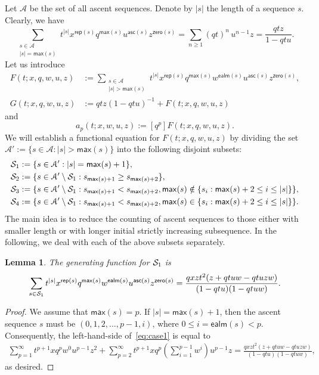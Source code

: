 \documentclass[12pt]{amsart}
\newcounter{mycount}
\theoremstyle{plain}
\newtheorem{lemma}[mycount]{Lemma}
\theoremstyle{definition}
\theoremstyle{example}
\theoremstyle{remark}
\numberwithin{equation}{section}
\numberwithin{figure}{section}
\newcommand{\asc}{\mathsf{asc}}
\def\max{\mathsf{max}}
\def\zero{\mathsf{zero}}
\def\rep{\mathsf{rep}}
\def\ealm{\mathsf{ealm}}
\def\A{\mathcal{A}}
\def\CS{ \CMcal{S}}
\begin{document}
Let $\A$ be the set of all ascent sequences. Denote by $|s|$ the length of a sequence $s$. Clearly, we have
$$
\sum_{\substack{s\in\A\\ \vert s \vert=\max(s)}}t^{\vert s\vert}x^{\rep(s)}q^{\max(s)}u^{\asc(s)}z^{\zero(s)}
=\sum_{n\geq1}(qt)^n\,u^{n-1}z=\frac{qtz}{1-qtu}.
$$
Let us introduce
\begin{align*}
F(t;x,q,w,u,z)&:=\sum_{\substack{s\in\A\\ \vert s \vert>\max(s)}}t^{\vert s\vert}x^{\rep(s)}q^{\max(s)}w^{\ealm(s)}u^{\asc(s)}z^{\zero(s)},\\
G(t;x,q,w,u,z)&:=qtz(1-qtu)^{-1}+F(t;x,q,w,u,z)
\end{align*}
and
$$a_p(t;x,w,u,z):=[q^p]F(t;x,q,w,u,z).$$
We will establish a functional equation for $F(t;x,q,w,u,z)$ by dividing the set
$\A':=\{s\in\A:\vert s\vert> \max(s)\}$
 into the following disjoint subsets:
 \begin{align*}
 \CMcal{S}_{1}&:=\{s\in\A': \vert s\vert=\max(s)+1\},\\
 \CMcal{S}_{2}&:=\{s\in\A'\setminus\CMcal{S}_{1}: s_{\max(s)+1}\ge s_{\max(s)+2}\},\\
 \CMcal{S}_{3}&:=\{s\in\A'\setminus\CMcal{S}_{1}: s_{\max(s)+1}< s_{\max(s)+2},\max(s)\notin\{s_i: \max(s)+2\leq i\leq |s|\}\},\\
 \CMcal{S}_{4}&:=\{s\in\A'\setminus\CMcal{S}_{1}: s_{\max(s)+1}< s_{\max(s)+2},\max(s)\in\{s_i: \max(s)+2\leq i\leq |s|\}\}.
 \end{align*}
 The main idea is to reduce the counting of ascent sequences to those either with smaller length or with longer initial strictly increasing subsequence. In the following, we deal with each of the above subsets separately.  







\begin{lemma}\label{L:case1}
The generating function for $\CS_1$ is
\begin{align}\label{eq:case1}
\sum_{s\in\CS_1}t^{\vert s\vert}x^{\rep(s)}q^{\max(s)}w^{\ealm(s)}u^{\asc(s)}z^{\zero(s)}
=\frac{qxzt^2(z+qtuw-qtuzw)}{(1-qtu)(1-qtuw)}.
\end{align}
\end{lemma}

\begin{proof}
We assume that $\max(s)=p$. If $\vert s\vert=\max(s)+1$, then the ascent sequence $s$ must be $(0,1,2,\ldots,p-1,i)$, where $0\le i=\ealm(s)<p$. Consequently, the left-hand-side of~\eqref{eq:case1} is equal to
\begin{align*}
\sum_{p=1}^{\infty}t^{p+1}x q^p w^0 u^{p-1}z^2 +\sum_{p=2}^{\infty}t^{p+1} x q^p \left(\sum_{i=1}^{p-1}w^i\right)u^{p-1}z
=\frac{qxzt^2(z+qtuw-qtuzw)}{(1-qtu)(1-qtuw)},
\end{align*}
as desired.
\end{proof}
\end{document}
